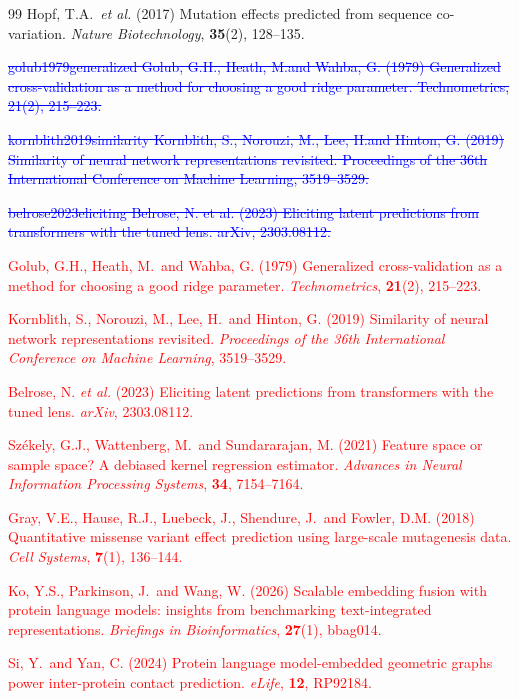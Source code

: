 \documentclass[11pt,a4paper]{article}
\newcommand{\rev}[1]{\textcolor{red}{#1}}
\begin{document}
\begin{thebibliography}{99}
Hopf, T.A.\ \textit{et al.} (2017)
Mutation effects predicted from sequence co-variation.
\textit{Nature Biotechnology}, \textbf{35}(2), 128--135.

\textcolor{blue}{\sout{golub1979generalized
Golub, G.H., Heath, M.and Wahba, G. (1979)
Generalized cross-validation as a method for choosing a good ridge parameter.
Technometrics, 21(2), 215--223.}}

\textcolor{blue}{\sout{kornblith2019similarity
Kornblith, S., Norouzi, M., Lee, H.and Hinton, G. (2019)
Similarity of neural network representations revisited.
Proceedings of the 36th International Conference on Machine Learning,
3519--3529.}}

\textcolor{blue}{\sout{belrose2023eliciting
Belrose, N. et al. (2023)
Eliciting latent predictions from transformers with the tuned lens.
arXiv, 2303.08112.}}

\textcolor{red}{
\rev{Golub, G.H., Heath, M.\ and Wahba, G. (1979)
Generalized cross-validation as a method for choosing a good ridge parameter.
\textit{Technometrics}, \textbf{21}(2), 215--223.}}

\textcolor{red}{
\rev{Kornblith, S., Norouzi, M., Lee, H.\ and Hinton, G. (2019)
Similarity of neural network representations revisited.
\textit{Proceedings of the 36th International Conference on Machine Learning},
3519--3529.}}

\textcolor{red}{
\rev{Belrose, N. \textit{et al.} (2023)
Eliciting latent predictions from transformers with the tuned lens.
\textit{arXiv}, 2303.08112.}}

\textcolor{red}{
\rev{Sz\'ekely, G.J., Wattenberg, M.\ and Sundararajan, M. (2021)
Feature space or sample space? A debiased kernel regression estimator.
\textit{Advances in Neural Information Processing Systems}, \textbf{34},
7154--7164.}}

\textcolor{red}{
\rev{Gray, V.E., Hause, R.J., Luebeck, J., Shendure, J.\ and Fowler, D.M. (2018)
Quantitative missense variant effect prediction using large-scale mutagenesis data.
\textit{Cell Systems}, \textbf{7}(1), 136--144.}}

\textcolor{red}{
\rev{Ko, Y.S., Parkinson, J.\ and Wang, W. (2026)
Scalable embedding fusion with protein language models: insights from
benchmarking text-integrated representations.
\textit{Briefings in Bioinformatics}, \textbf{27}(1), bbag014.}}

\textcolor{red}{
\rev{Si, Y.\ and Yan, C. (2024)
Protein language model-embedded geometric graphs power inter-protein contact
prediction.
\textit{eLife}, \textbf{12}, RP92184.}}

\end{thebibliography}
\end{document}

